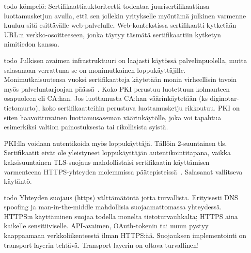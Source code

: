 \documentclass[finnish,gradu]{tktltiki}
\begin{document}
  todo kömpelö:
  Sertifikaattiauktoriteetti todentaa juurisertifikaattinsa luottamusketjun avulla, että sen jollekin yritykselle myöntämä julkinen varmenne kuuluu sitä esittävälle web-palvelulle. Web-kontekstissa sertifikaatti kytketään URL:n verkko-osoitteeseen, jonka täytyy täsmätä sertifikaattiin kytketyn nimitiedon kanssa.

  todo
  Julkisen avaimen infrastruktuuri on laajasti käytössä palvelinpuolella, mutta salasanaan verrattuna se on monimutkainen loppukäyttäjille. Monimutkaisuutensa vuoksi sertifikaatteja käytetään monin virheellisin tavoin myös palveluntarjoajan päässä~\cite{eff_ssliverse}. Koko PKI perustuu luotettuun kolmanteen osapuoleen eli CA:han. Jos luottamusta CA:han väärinkäytetään (ks diginotar-tietomurto), koko sertifikaatteihin perustuva luottamusketju rikkoutuu. PKI on siten haavoittuvainen luottamusaseman väärinkäytölle, joka voi tapahtua esimerkiksi valtion painostuksesta tai rikollisista syistä.

   PKI:lla voidaan autentikoida myös loppukäyttäjä. Tällöin 2-suuntainen tls. Sertifikaatit eivät ole yleistyneet loppukäyttäjän autentikointitapana, vaikka kaksisuuntainen TLS-suojaus mahdollistaisi sertifikaatin käyttämisen varmenteena HTTPS-yhteyden molemmissa päätepisteissä~\cite{henry_story_foaf_ssl, webid_home}. Salasanat vallitseva käytäntö.

  todo
  Yhteyden suojaus (https) välttämätöntä jotta turvallista. Erityisesti DNS spoofing ja man-in-the-middle mahdollisia suojaamattomassa yhteydessä.
  HTTPS:n käyttäminen suojaa todella monelta tietoturvauhkalta;
  HTTPS aina kaikelle sensitiiviselle. API-avaimen, OAuth-tokenin tai muun pystyy kaappaamaan verkkoliikenteestä ilman HTTPS:ää.  Suojauksen implementointi on transport layerin tehtävä. Transport layerin on oltava turvallinen!

\end{document}
